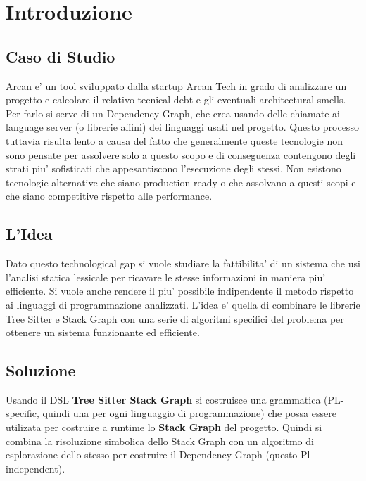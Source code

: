\chapter{Introduzione}

\section{Caso di Studio}

Arcan e' un tool sviluppato dalla startup Arcan Tech in grado di analizzare un progetto e calcolare il relativo tecnical debt e gli eventuali architectural smells. Per farlo si serve di un Dependency Graph, che crea usando delle chiamate ai language server (o librerie affini) dei linguaggi usati nel progetto.
Questo processo tuttavia risulta lento a causa del fatto che generalmente queste tecnologie non sono pensate per assolvere solo a questo scopo e di conseguenza contengono degli strati piu' sofisticati che appesantiscono l'esecuzione degli stessi. Non esistono tecnologie alternative che siano production ready o che assolvano a questi scopi e che siano competitive rispetto alle performance.

\section{L'Idea}

Dato questo technological gap si vuole studiare la fattibilita' di un sistema che usi l'analisi statica lessicale per ricavare le stesse informazioni in maniera piu' efficiente.
Si vuole anche rendere il piu' possibile indipendente il metodo rispetto ai linguaggi di programmazione analizzati.
L'idea e' quella di combinare le librerie Tree Sitter e Stack Graph con una serie di algoritmi specifici del problema per ottenere un sistema funzionante ed efficiente.

\section{Soluzione}

Usando il DSL \textbf{Tree Sitter Stack Graph} si costruisce una grammatica (PL-specific, quindi una per ogni linguaggio di programmazione) che possa essere utilizata per costruire a runtime lo \textbf{Stack Graph} del progetto.
Quindi si combina la risoluzione simbolica dello Stack Graph con un algoritmo di esplorazione dello stesso per costruire il Dependency Graph (questo Pl-independent).

